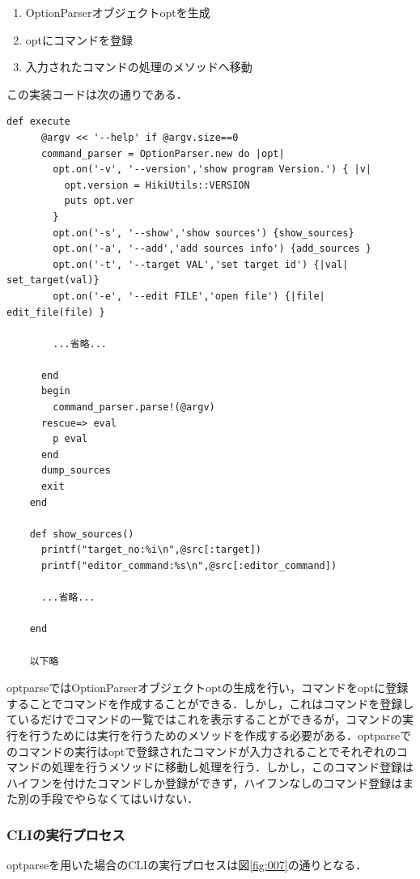 \begin{enumerate}
\item OptionParserオブジェクトoptを生成
\item optにコマンドを登録
\item 入力されたコマンドの処理のメソッドへ移動
\end{enumerate}
この実装コードは次の通りである．
\begin{lstlisting}[style=customRuby,basicstyle={\scriptsize\ttfamily}]
    def execute
      @argv << '--help' if @argv.size==0
      command_parser = OptionParser.new do |opt|
        opt.on('-v', '--version','show program Version.') { |v|
          opt.version = HikiUtils::VERSION
          puts opt.ver
        }
        opt.on('-s', '--show','show sources') {show_sources}
        opt.on('-a', '--add','add sources info') {add_sources }
        opt.on('-t', '--target VAL','set target id') {|val| set_target(val)}
        opt.on('-e', '--edit FILE','open file') {|file| edit_file(file) }

        ...省略...

      end
      begin
        command_parser.parse!(@argv)
      rescue=> eval
        p eval
      end
      dump_sources
      exit
    end    
    
    def show_sources()
      printf("target_no:%i\n",@src[:target])
      printf("editor_command:%s\n",@src[:editor_command])

      ...省略...

    end

    以下略

\end{lstlisting}
optparseではOptionParserオブジェクトoptの生成を行い，コマンドをoptに登録することでコマンドを作成することができる．しかし，これはコマンドを登録しているだけでコマンドの一覧ではこれを表示することができるが，コマンドの実行を行うためには実行を行うためのメソッドを作成する必要がある．optparseでのコマンドの実行はoptで登録されたコマンドが入力されることでそれぞれのコマンドの処理を行うメソッドに移動し処理を行う．しかし，このコマンド登録はハイフンを付けたコマンドしか登録ができず，ハイフンなしのコマンド登録はまた別の手段でやらなくてはいけない．

\subsubsection{CLIの実行プロセス}
optparseを用いた場合のCLIの実行プロセスは図\ref{fig:007}の通りとなる．

